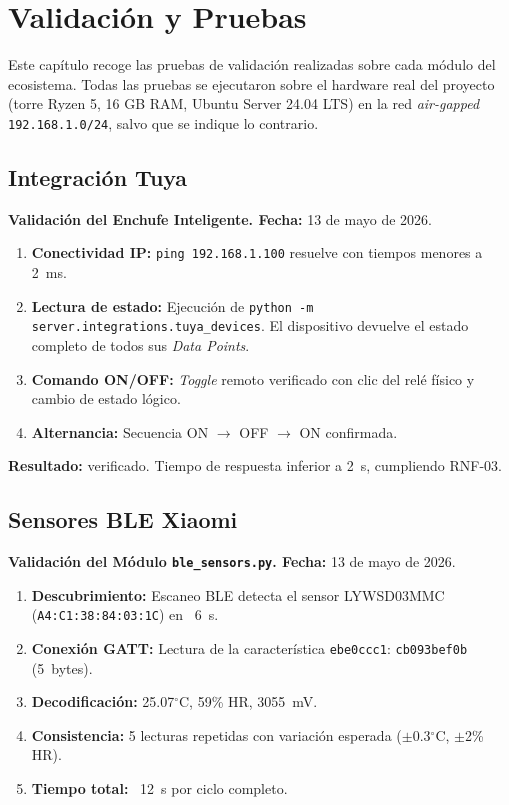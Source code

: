 \chapter{Validación y Pruebas}\label{cap:validacion}


Este capítulo recoge las pruebas de validación realizadas sobre cada módulo del ecosistema. Todas las pruebas se ejecutaron sobre el hardware real del proyecto (torre Ryzen 5, 16 GB RAM, Ubuntu Server 24.04 LTS) en la red \textit{air-gapped} \texttt{192.168.1.0/24}, salvo que se indique lo contrario.

\section{Integración Tuya}
\label{sec:pruebas_tuya}

\textbf{Validación del Enchufe Inteligente. Fecha:} 13 de mayo de 2026.

\begin{enumerate}
    \item \textbf{Conectividad IP:} \texttt{ping 192.168.1.100} resuelve con tiempos menores a 2~ms.
    \item \textbf{Lectura de estado:} Ejecución de \texttt{python -m server.integrations.tuya\_devices}. El dispositivo devuelve el estado completo de todos sus \textit{Data Points}.
    \item \textbf{Comando ON/OFF:} \textit{Toggle} remoto verificado con clic del relé físico y cambio de estado lógico.
    \item \textbf{Alternancia:} Secuencia ON $\rightarrow$ OFF $\rightarrow$ ON confirmada.
\end{enumerate}

\textbf{Resultado:} verificado. Tiempo de respuesta inferior a 2~s, cumpliendo RNF-03.

\section{Sensores BLE Xiaomi}
\label{sec:pruebas_ble}

\textbf{Validación del Módulo \texttt{ble\_sensors.py}. Fecha:} 13 de mayo de 2026.

\begin{enumerate}
    \item \textbf{Descubrimiento:} Escaneo BLE detecta el sensor LYWSD03MMC (\texttt{A4:C1:38:84:03:1C}) en ~6~s.
    \item \textbf{Conexión GATT:} Lectura de la característica \texttt{ebe0ccc1}: \texttt{cb093bef0b} (5~bytes).
    \item \textbf{Decodificación:} 25.07$^\circ$C, 59\% HR, 3055~mV.
    \item \textbf{Consistencia:} 5 lecturas repetidas con variación esperada ($\pm$0.3$^\circ$C, $\pm$2\% HR).
    \item \textbf{Tiempo total:} ~12~s por ciclo completo.
\end{enumerate}

